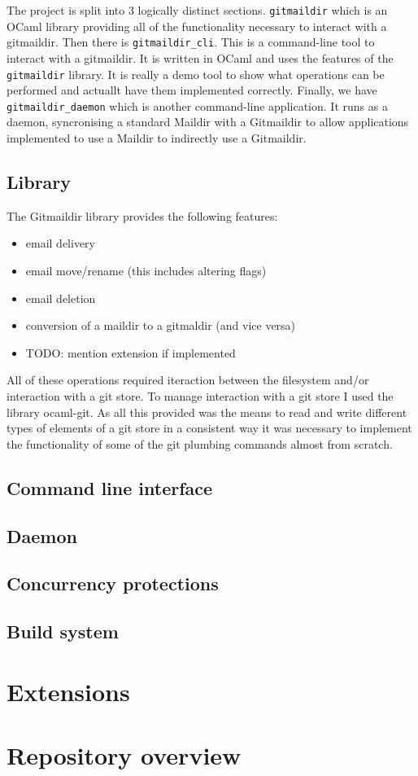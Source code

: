 The project is split into 3 logically distinct sections. \texttt{gitmaildir} which is an OCaml library providing all of the functionality necessary to interact with a gitmaildir. Then there is \texttt{gitmaildir\_cli}. This is a command-line tool to interact with a gitmaildir. It is written in OCaml and uses the features of the \texttt{gitmaildir} library. It is really a demo tool to show what operations can be performed and actuallt have them implemented correctly. Finally, we have \texttt{gitmaildir\_daemon} which is another command-line application. It runs as a daemon, syncronising a standard Maildir with a Gitmaildir to allow applications implemented to use a Maildir to indirectly use a Gitmaildir.

\subsection{Library}

The Gitmaildir library provides the following features:

\begin{itemize}
\item email delivery
\item email move/rename (this includes altering flags)
\item email deletion
\item conversion of a maildir to a gitmaldir (and vice versa)
\item TODO: mention extension if implemented
\end{itemize}

All of these operations required iteraction between the filesystem and/or interaction with a git store. To manage interaction with a git store I used the library ocaml-git. As all this provided was the means to read and write different types of elements of a git store in a consistent way it was necessary to implement the functionality of some of the git plumbing commands almost from scratch.

\subsection{Command line interface}

\subsection{Daemon}

\subsection{Concurrency protections}

\subsection{Build system}

\section{Extensions}

\section{Repository overview}
